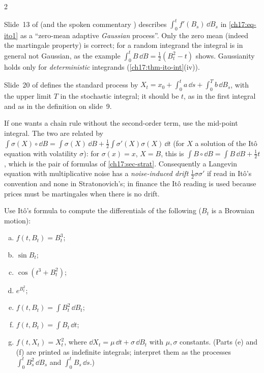 \begin{paracol}{2}
\begin{coursenote}
Slide~13 of  (and the spoken commentary ) describes $\int_0^tf'(B_s)\,\dd B_s$ in \eqref{ch17:eq-ito1} as a ``zero-mean adaptive \emph{Gaussian} process''. Only the zero mean
(indeed the martingale property) is correct; for a random integrand the integral is in general not Gaussian, as the
example $\int_0^tB\,\dd B=\tfrac12(B_t^2-t)$ shows. Gaussianity holds only for \emph{deterministic} integrands (\cref{ch17:thm-ito-int}(iv)).
\end{coursenote}

\begin{coursenote}
Slide~20 of  defines the standard process by $X_t=x_0+\int_0^ta\,\dd s+\int_0^Tb\,\dd B_s$, with the upper limit $T$ in the stochastic integral; it should be $t$, as in the first integral and as in the definition on slide~9.
\end{coursenote}

\begin{remark}\label{ch17:rem-strat}
If one wants a chain rule without the second-order term, use the mid-point integral. The two are related by
$\int\sigma(X)\circ\dd B=\int\sigma(X)\,\dd B+\tfrac12\int\sigma'(X)\sigma(X)\,\dd t$ (for $X$ a solution of the It\^o equation with volatility $\sigma$): for $\sigma(x)=x$, $X=B$, this is $\int B\circ\dd B=\int B\,\dd B+\tfrac12t$,
which is the pair of formulas of \cref{ch17:sec-strat}. Consequently a Langevin equation with multiplicative noise has a \emph{noise-induced drift} $\tfrac12\sigma\sigma'$ if read in It\^o's convention and none in Stratonovich's;
in finance the It\^o reading is used because prices must be martingales when there is no drift.
\end{remark}

\begin{exercise}\label{ch17:ex-a4}
Use It\^o's formula to compute the differentials of the following ($B_t$ is a Brownian motion):
\begin{enumerate}[(a)]
  \item $f(t,B_t)=B_t^3$;
  \item $\sin B_t$;
  \item $\cos(t^3+B_t^2)$;
  \item $e^{B_t^2}$;
  \item $f(t,B_t)=\int B_t^2\,\dd B_t$;
  \item $f(t,B_t)=\int B_t\,\dd t$;
  \item $f(t,X_t)=X_t^2$, where $\dd X_t=\mu\,\dd t+\sigma\,\dd B_t$ with $\mu,\sigma$ constants. (Parts (e) and (f) are printed as indefinite integrals; interpret them as the processes $\int_0^tB_s^2\,\dd B_s$ and $\int_0^tB_s\,\dd s$.)
\end{enumerate}
\end{exercise}


\end{paracol}
